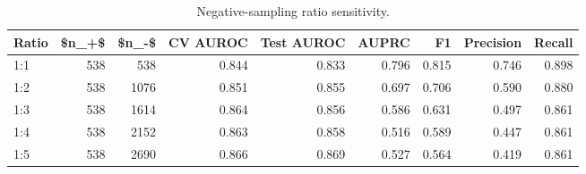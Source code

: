 \begin{table}[htbp]
\centering
\caption{Negative-sampling ratio sensitivity.}
\label{tab:robustness_recomputed}
\begin{tabular}{lrrrrrrrr}
\toprule
Ratio & \$n\_+\$ & \$n\_-\$ & CV AUROC & Test AUROC & AUPRC & F1 & Precision & Recall \\
\midrule
1:1 & 538 & 538 & 0.844 & 0.833 & 0.796 & 0.815 & 0.746 & 0.898 \\
1:2 & 538 & 1076 & 0.851 & 0.855 & 0.697 & 0.706 & 0.590 & 0.880 \\
1:3 & 538 & 1614 & 0.864 & 0.856 & 0.586 & 0.631 & 0.497 & 0.861 \\
1:4 & 538 & 2152 & 0.863 & 0.858 & 0.516 & 0.589 & 0.447 & 0.861 \\
1:5 & 538 & 2690 & 0.866 & 0.869 & 0.527 & 0.564 & 0.419 & 0.861 \\
\bottomrule
\end{tabular}

\end{table}

